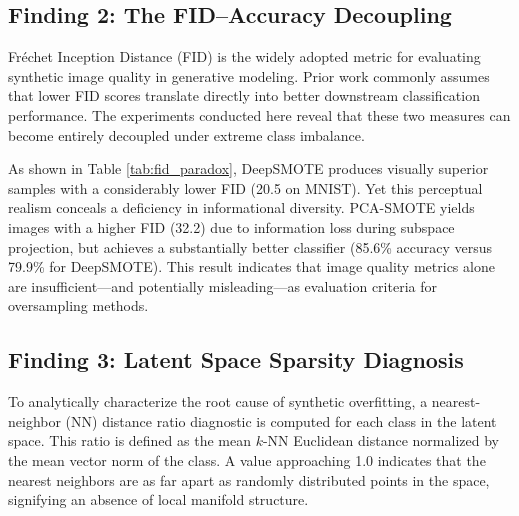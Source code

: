 \documentclass[conference]{IEEEtran}
\begin{document}
\subsection{Finding 2: The FID--Accuracy Decoupling}
\label{subsec:fid}
Fr\'{e}chet Inception Distance (FID) \cite{heusel2017gans} is the widely adopted metric for evaluating synthetic image quality in generative modeling. Prior work commonly assumes that lower FID scores translate directly into better downstream classification performance. The experiments conducted here reveal that these two measures can become entirely decoupled under extreme class imbalance.

As shown in Table \ref{tab:fid_paradox}, DeepSMOTE produces visually superior samples with a considerably lower FID (20.5 on MNIST). Yet this perceptual realism conceals a deficiency in informational diversity. PCA-SMOTE yields images with a higher FID (32.2) due to information loss during subspace projection, but achieves a substantially better classifier (85.6\% accuracy versus 79.9\% for DeepSMOTE). This result indicates that image quality metrics alone are insufficient---and potentially misleading---as evaluation criteria for oversampling methods.

\begin{table}[t]
    \centering
    \caption{The FID--Accuracy Decoupling (MNIST Class 9, Seed 10). A lower FID implies more realistic images, yet it corresponds to a worse downstream classifier.}
    \label{tab:fid_paradox}
\end{table}

\subsection{Finding 3: Latent Space Sparsity Diagnosis}
\label{subsec:sparsity}
To analytically characterize the root cause of synthetic overfitting, a nearest-neighbor (NN) distance ratio diagnostic is computed for each class in the latent space. This ratio is defined as the mean $k$-NN Euclidean distance normalized by the mean vector norm of the class. A value approaching 1.0 indicates that the nearest neighbors are as far apart as randomly distributed points in the space, signifying an absence of local manifold structure.
\end{document}
